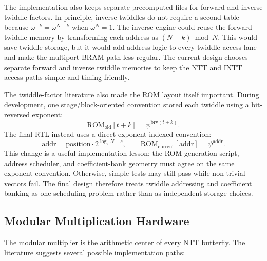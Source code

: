 \documentclass[a4paper, 12pt, titlepage]{article}
\begin{document}
The implementation also keeps separate precomputed files for forward and
inverse twiddle factors. In principle, inverse twiddles do not require a second
table because \(\omega^{-k}=\omega^{N-k}\) when \(\omega^N=1\). The inverse
engine could reuse the forward twiddle memory by transforming each address as
\((N-k) \bmod N\). This would save twiddle storage, but it would add address
logic to every twiddle access lane and make the multiport BRAM path less
regular. The current design chooses separate forward and inverse twiddle
memories to keep the NTT and INTT access paths simple and timing-friendly.

The twiddle-factor literature also made the ROM layout itself important. During
development, one stage/block-oriented convention stored each twiddle using a
bit-reversed exponent:
\[
    \mathrm{ROM}_{\mathrm{old}}[t+k] = \psi^{\mathrm{brv}(t+k)} .
\]
The final RTL instead uses a direct exponent-indexed convention:
\[
    \mathrm{addr} = \mathrm{position}\cdot 2^{\log_2 N-s},
    \qquad
    \mathrm{ROM}_{\mathrm{current}}[\mathrm{addr}] = \psi^{\mathrm{addr}} .
\]
This change is a useful implementation lesson: the ROM-generation script,
address scheduler, and coefficient-bank geometry must agree on the same
exponent convention. Otherwise, simple tests may still pass while non-trivial
vectors fail. The final design therefore treats twiddle addressing and
coefficient banking as one scheduling problem rather than as independent
storage choices.

\subsection{Modular Multiplication Hardware}

The modular multiplier is the arithmetic center of every NTT butterfly. The
literature suggests several possible implementation paths:
\end{document}
